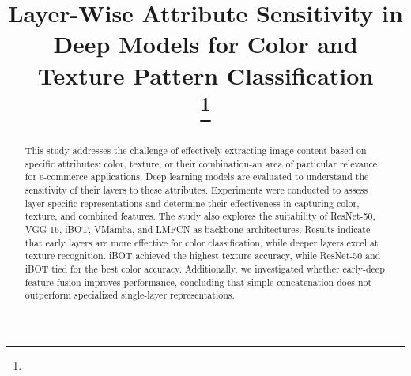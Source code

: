 \documentclass[conference]{IEEEtran}
\begin{document}
\title{Layer-Wise Attribute Sensitivity in Deep Models for Color and Texture Pattern Classification\\
\thanks{}
}


\author{
}


\maketitle

\begin{abstract}
This study addresses the challenge of effectively extracting image content based on specific attributes: color, texture, or their combination-an area of particular relevance for e-commerce applications. Deep learning models are evaluated to understand the sensitivity of their layers to these attributes. Experiments were conducted to assess layer-specific representations and determine their effectiveness in capturing color, texture, and combined features. The study also explores the suitability of ResNet-50, VGG-16, iBOT, VMamba, and LMFCN as backbone architectures. Results indicate that early layers are more effective for color classification, while deeper layers excel at texture recognition. iBOT achieved the highest texture accuracy, while ResNet-50 and iBOT tied for the best color accuracy. Additionally, we investigated whether early-deep feature fusion improves performance, concluding that simple concatenation does not outperform specialized single-layer representations.
\end{abstract}
\end{document}
